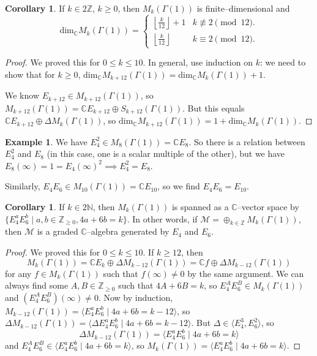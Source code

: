 \documentclass{article}
\theoremstyle{definition}
\newtheorem{cor}[theorem]{Corollary}
\newtheorem{example}{Example}[section]
\begin{document}
\begin{cor}
    If $k \in 2\mathbb{Z}$, $k\ge 0$, then $M_k(\Gamma(1))$ is finite--dimensional and $$\text{dim}_{\mathbb{C}}M_k(\Gamma(1)) = \begin{cases}
        \left\lfloor \frac{k}{12} \right\rfloor + 1 & k \not\equiv 2 \pmod{12}.\\
        \left\lfloor \frac{k}{12} \right\rfloor & k \equiv 2 \pmod{12}.
    \end{cases}$$
\end{cor}
\begin{proof}
    We proved this for $0\le k \le 10$. In general, use induction on $k$: we need to show that for $k\ge 0$, $\text{dim}_{\mathbb{C}}M_{k+12}(\Gamma(1)) = \text{dim}_{\mathbb{C}}M_k(\Gamma(1)) + 1$.
    \vspace{1mm}
     
    We know $E_{k+12} \in M_{k+12}(\Gamma(1))$, so $M_{k+12}(\Gamma(1)) = \mathbb{C} E_{k+12} \oplus S_{k+12}(\Gamma(1))$. But this equals $\mathbb{C} E_{k+12} \oplus \Delta M_k(\Gamma(1))$, so $\text{dim}_{\mathbb{C}} M_{k+12}(\Gamma(1)) = 1 + \text{dim}_{\mathbb{C}}M_k(\Gamma(1))$.
\end{proof}
\begin{example}
    We have $E_4^2 \in M_8(\Gamma(1)) = \mathbb{C} E_8$. So there is a relation between $E_4^2$ and $E_8$ (in this case, one is a scalar multiple of the other), but we have $E_8(\infty) = 1 = E_4(\infty)^2 \implies E_4^2 = E_8$.
    \vspace{1mm}
     
    Similarly, $E_4E_6 \in M_{10}(\Gamma(1)) = \mathbb{C} E_{10}$, so we find  $E_4 E_6 = E_{10}$.
\end{example}
\begin{cor}
    If $k \in 2\mathbb{N}$, then $M_k(\Gamma(1))$ is spanned as a $\mathbb{C}$--vector space by $\{E_4^aE_6^b \mid a,b \in \mathbb{Z}_{\ge 0}, 4a+6b=k\}$. In other words, if $\mathcal{M} = \oplus_{k \in \mathbb{Z}}M_k(\Gamma(1))$, then $\mathcal{M}$ is a graded $\mathbb{C}$--algebra generated by $E_4$ and $E_6$.
\end{cor}
\begin{proof}
    We proved this for $0\le k\le 10$. If $k\ge 12$, then $$M_k(\Gamma(1)) = \mathbb{C} E_k \oplus \Delta M_{k-12}(\Gamma(1)) = \mathbb{C} f \oplus \Delta M_{k-12}(\Gamma(1))$$ for any $f \in M_k(\Gamma(1))$ such that $f(\infty) \neq 0$ by the same argument. We can always find some $A,B \in \mathbb{Z}_{\ge 0}$ such that $4A+6B = k$, so $E_4^A E_6^B \in M_k(\Gamma(1))$ and $(E_4^A E_6^B)(\infty) \neq 0$. Now by induction, $M_{k-12}(\Gamma(1)) = \langle E_4^a E_6^b \mid 4a+6b = k-12 \rangle$, so $\Delta M_{k-12}(\Gamma(1)) = \langle \Delta E_4^a E_6^b \mid 4a+6b = k -12 \rangle$. But $\Delta \in \langle E_4^3, E_6^2 \rangle$, so \[
    \Delta M_{k-12}(\Gamma(1)) = \langle E_4^a E_6^b \mid 4a+6b = k \rangle
    \]
    and $E_4^A E_6^B \in \langle E_4^a E_6^b \mid 4a+6b = k \rangle$, so $M_k(\Gamma(1)) = \langle E_4^a E_6^b \mid 4a+6b = k \rangle$.
\end{proof}
\end{document}
